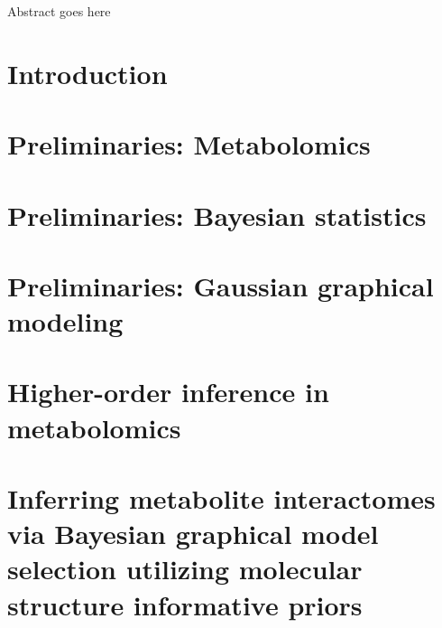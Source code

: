 \documentclass[final]{ulthesis}
\begin{document}
\begin{dissertationabstract}
Abstract goes here
\end{dissertationabstract}

\tableofcontents \clearpage
\listoftables \clearpage
\listoffigures \clearpage

\mainmatter


\chapter{Introduction}


\chapter{Preliminaries: Metabolomics}


\chapter{Preliminaries: Bayesian statistics}


\chapter{Preliminaries: Gaussian graphical modeling}


\chapter{Higher-order inference in metabolomics}


\chapter{Inferring metabolite interactomes via Bayesian graphical model selection utilizing molecular structure informative priors}

\end{document}

